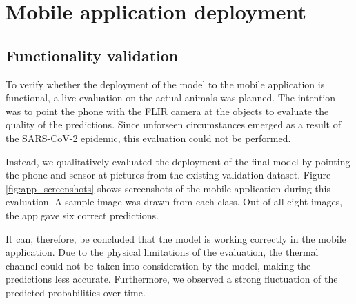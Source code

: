 \documentclass{l4proj}
\begin{document}

\section{Mobile application deployment}

\subsection{Functionality validation}

To verify whether the deployment of the model to the mobile application is functional, a live evaluation on the actual animals was planned. The intention was to point the phone with the FLIR camera at the objects to evaluate the quality of the predictions. Since unforseen circumstances emerged as a result of the SARS-CoV-2 epidemic, this evaluation could not be performed.

Instead, we qualitatively evaluated the deployment of the final model by pointing the phone and sensor at pictures from the existing validation dataset. Figure \ref{fig:app_screenshots} shows screenshots of the mobile application during this evaluation. A sample image was drawn from each class. Out of all eight images, the app gave six correct predictions.

It can, therefore, be concluded that the model is working correctly in the mobile application. Due to the physical limitations of the evaluation, the thermal channel could not be taken into consideration by the model, making the predictions less accurate. Furthermore, we observed a strong fluctuation of the predicted probabilities over time.
\end{document}
